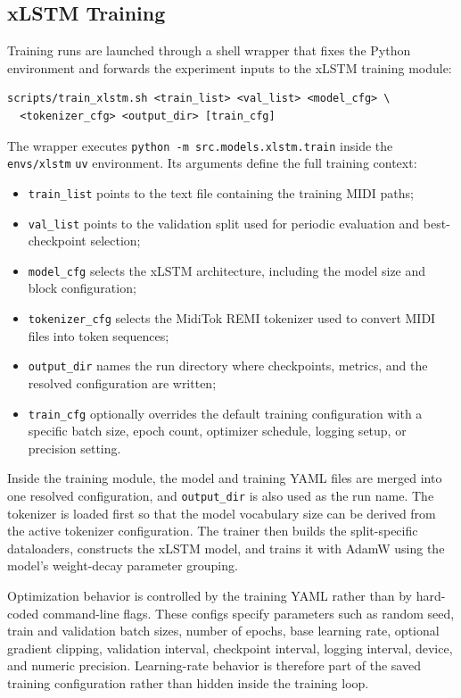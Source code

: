\subsection{xLSTM Training}

Training runs are launched through a shell wrapper that fixes the Python environment and forwards the experiment inputs to the xLSTM training module:
\begin{verbatim}
scripts/train_xlstm.sh <train_list> <val_list> <model_cfg> \
  <tokenizer_cfg> <output_dir> [train_cfg]
\end{verbatim}

The wrapper executes \verb|python -m src.models.xlstm.train| inside the \verb|envs/xlstm| \verb|uv| environment. Its arguments define the full training context:
\begin{itemize}
	\item \verb|train_list| points to the text file containing the training MIDI paths;
	\item \verb|val_list| points to the validation split used for periodic evaluation and best-checkpoint selection;
	\item \verb|model_cfg| selects the xLSTM architecture, including the model size and block configuration;
	\item \verb|tokenizer_cfg| selects the MidiTok REMI tokenizer used to convert MIDI files into token sequences;
	\item \verb|output_dir| names the run directory where checkpoints, metrics, and the resolved configuration are written;
	\item \verb|train_cfg| optionally overrides the default training configuration with a specific batch size, epoch count, optimizer schedule, logging setup, or precision setting.
\end{itemize}

Inside the training module, the model and training YAML files are merged into one resolved configuration, and \verb|output_dir| is also used as the run name. The tokenizer is loaded first so that the model vocabulary size can be derived from the active tokenizer configuration. The trainer then builds the split-specific dataloaders, constructs the xLSTM model, and trains it with AdamW \citep{loshchilovDecoupledWeightDecay2019} using the model's weight-decay parameter grouping.

Optimization behavior is controlled by the training YAML rather than by hard-coded command-line flags. These configs specify parameters such as random seed, train and validation batch sizes, number of epochs, base learning rate, optional gradient clipping, validation interval, checkpoint interval, logging interval, device, and numeric precision. Learning-rate behavior is therefore part of the saved training configuration rather than hidden inside the training loop.

